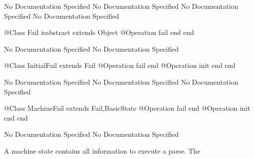 No Documentation Specified
No Documentation Specified
No Documentation Specified
No Documentation Specified
\begin{Interface}
@Class Fail isabstract extends Object
  @Operation fail end
end
\end{Interface}
No Documentation Specified
No Documentation Specified
\begin{Interface}
@Class InitialFail extends Fail
  @Operation fail end
  @Operation init end
end
\end{Interface}
No Documentation Specified
No Documentation Specified
No Documentation Specified
\begin{Interface}
@Class MachineFail extends Fail,BasicState
  @Operation fail end
  @Operation init end
end
\end{Interface}
No Documentation Specified
No Documentation Specified

       A machine state contains all information to execute a parse. The

